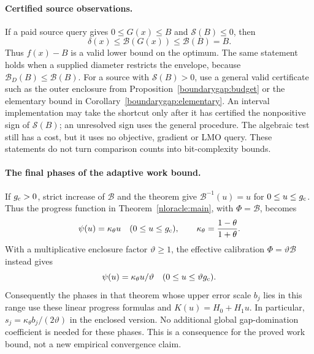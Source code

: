 \paragraph{Certified source observations.}
If a paid source query gives $0\le G(x)\le B$ and
$\mathcal S(B)\le0$, then
\begin{equation}\label{gapregime:inexact}
 \delta(x)\le\mathcal B(G(x))\le\mathcal B(B)=B.
\end{equation}
Thus $f(x)-B$ is a valid lower bound on the optimum.  The same
statement holds when a supplied diameter restricts the envelope,
because $\mathcal B_D(B)\le\mathcal B(B)$.
For a source with $\mathcal S(B)>0$, use a general valid certificate
such as the outer enclosure from Proposition~\ref{boundarygap:budget}
or the elementary bound in Corollary~\ref{boundarygap:elementary}.
An interval implementation may take the shortcut only after it has
certified the nonpositive sign of $\mathcal S(B)$; an unresolved sign
uses the general procedure.  The algebraic test still has a cost,
but it uses no objective, gradient or LMO query.  These statements
do not turn comparison counts into bit-complexity bounds.

\paragraph{The final phases of the adaptive work bound.}
If $g_{\rm c}>0$, strict increase of $\mathcal B$ and the theorem
give $\mathcal B^{-1}(u)=u$ for $0\le u\le g_{\rm c}$.
Thus the progress function in Theorem~\ref{nloracle:main}, with
$\Phi=\mathcal B$, becomes
\[
 \psi(u)=\kappa_\theta u
 \quad(0\le u\le g_{\rm c}),\qquad
 \kappa_\theta=\frac{1-\theta}{1+\theta}.
\]
With a multiplicative enclosure factor $\vartheta\ge1$, the
effective calibration $\Phi=\vartheta\mathcal B$ instead gives
\[
 \psi(u)=\kappa_\theta u/\vartheta
 \quad(0\le u\le\vartheta g_{\rm c}).
\]
Consequently the phases in that theorem whose upper error scale
$b_j$ lies in this range use these linear progress formulas and
$K(u)=H_0+H_1u$.  In particular,
$s_j=\kappa_\theta b_j/(2\vartheta)$ in the enclosed version.
No additional global gap-domination coefficient is needed for these
phases.  This is a consequence for the proved work bound, not a new
empirical convergence claim.
